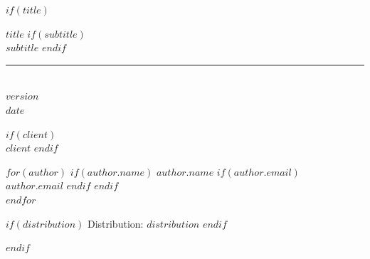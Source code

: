 \documentclass[10pt, a4paper, titlepage, oneside, openright, final, article]{memoir}
\begin{document}
%
$if(title)$
    \ifpdf
    \fi
    \newlength{\centeroffset}
    \thispagestyle{empty}
    \vspace*{2.0in}
    \begin{flushleft}
        {
            {\fontsize{20.28pt}{22pt}$title$}
            $if(subtitle)$
                {\\\fontsize{18.28pt}{22pt}$subtitle$}
            $endif$
        }
        \noindent\rule[-1ex]{\textwidth}{1pt}\\[2.8ex]

        {\fontsize{12pt}{22pt}$version$}\\[0.05in]
        {\fontsize{12pt}{22pt}$date$}

        $if(client)$
            \\[0.05in]
            {\fontsize{14pt}{22pt}$client$}
        $endif$

        \vspace*{\fill}

        $for(author)$
            $if(author.name)$
                {\fontsize{13pt}{15pt}$author.name$}
                $if(author.email)$
                    {\\[0.05in]\fontsize{12pt}{14pt}$author.email$}
                $endif$
            $endif$
            \\[0.2in]
        $endfor$

        \vspace*{0.5in}

        $if(distribution)$
            {\fontsize{12pt}{14pt}Distribution: $distribution$}
        $endif$
    \end{flushleft}
$endif$
\end{document}
